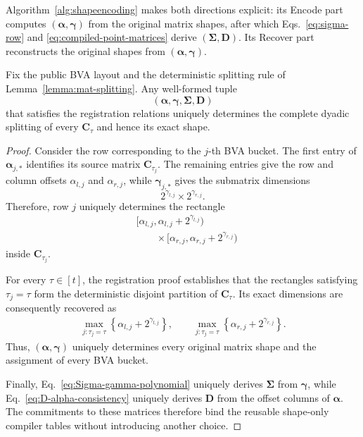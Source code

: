 Algorithm~\ref{alg:shapeencoding} makes both directions explicit: its
\textsf{Encode} part computes $(\bm\alpha,\bm\gamma)$ from the original
matrix shapes, after which Eqs.~\eqref{eq:sigma-row} and
\eqref{eq:compiled-point-matrices} derive $(\bm\Sigma,\bm D)$.  Its
\textsf{Recover} part reconstructs the original shapes from
$(\bm\alpha,\bm\gamma)$.



\begin{proposition}
\label{prop:shape-encoding}
Fix the public BVA layout and the deterministic splitting rule of
Lemma~\ref{lemma:mat-splitting}.  Any well-formed tuple
\[
    (\bm\alpha,\bm\gamma,\bm\Sigma,\bm D)
\]
that satisfies the registration relations uniquely determines the complete
dyadic splitting of every $\bm C_\tau$ and hence its exact shape.
\end{proposition}

\begin{proof}
Consider the row corresponding to the $j$-th BVA bucket.  The first entry of
$\bm\alpha_{j,*}$ identifies its source matrix $\bm C_{\tau_j}$.  The
remaining entries give the row and column offsets
$\alpha_{l,j}$ and $\alpha_{r,j}$, while $\bm\gamma_{j,*}$ gives the
submatrix dimensions
\[
    2^{\gamma_{l,j}}
    \times
    2^{\gamma_{r,j}}.
\]
Therefore, row $j$ uniquely determines the rectangle
\[
\begin{aligned}
&
[\alpha_{l,j},
  \alpha_{l,j}+2^{\gamma_{l,j}})
\\[-1mm]
&\qquad\times
[\alpha_{r,j},
  \alpha_{r,j}+2^{\gamma_{r,j}})
\end{aligned}
\]
inside $\bm C_{\tau_j}$.

For every $\tau\in[t]$, the registration proof establishes that the
rectangles satisfying $\tau_j=\tau$ form the deterministic disjoint
partition of $\bm C_\tau$.  Its exact dimensions are consequently recovered
as
\[
\begin{aligned}
\max_{j:\tau_j=\tau}
\left\{
\alpha_{l,j}+2^{\gamma_{l,j}}
\right\},
\qquad
\max_{j:\tau_j=\tau}
\left\{
\alpha_{r,j}+2^{\gamma_{r,j}}
\right\}.
\end{aligned}
\]
Thus, $(\bm\alpha,\bm\gamma)$ uniquely determines every original matrix
shape and the assignment of every BVA bucket.

Finally, Eq.~\eqref{eq:Sigma-gamma-polynomial} uniquely derives
$\bm\Sigma$ from $\bm\gamma$, while
Eq.~\eqref{eq:D-alpha-consistency} uniquely derives $\bm D$ from the offset
columns of $\bm\alpha$.  The commitments to these matrices therefore bind
the reusable shape-only compiler tables without introducing another choice.
\end{proof}


